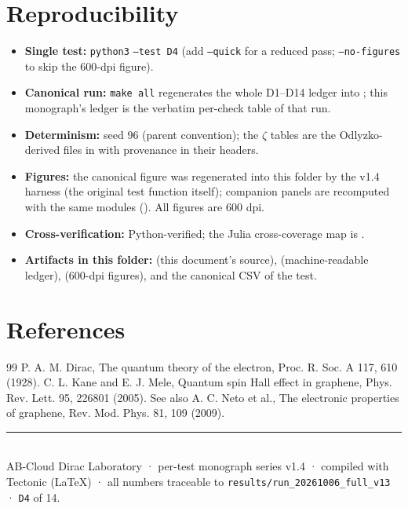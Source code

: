 \documentclass[11pt,a4paper]{article}
\begin{document}
\section{Reproducibility}
\begin{itemize}[leftmargin=1.2em, itemsep=0.15em]
\item \textbf{Single test:} \texttt{python3}  \texttt{--test D4} (add \texttt{--quick} for a reduced pass; \texttt{--no-figures} to skip the 600-dpi figure).
\item \textbf{Canonical run:} \texttt{make all} regenerates the whole D1--D14 ledger into ; this monograph's ledger is the verbatim per-check table of that run.
\item \textbf{Determinism:} seed 96 (parent convention); the $\zeta$ tables are the Odlyzko-derived files in  with provenance in their headers.
\item \textbf{Figures:} the canonical figure was regenerated into this folder by the v1.4 harness (the original test function itself); companion panels are recomputed with the same modules (). All figures are 600 dpi.
\item \textbf{Cross-verification:} Python-verified; the Julia cross-coverage map is .
\item \textbf{Artifacts in this folder:}  (this document's source),  (machine-readable ledger),  (600-dpi figures), and the canonical CSV of the test.
\end{itemize}

\section*{References}
\begin{thebibliography}{99}\small
{} P. A. M. Dirac, The quantum theory of the electron, Proc. R. Soc. A 117, 610 (1928).
 C. L. Kane and E. J. Mele, Quantum spin Hall effect in graphene, Phys. Rev. Lett. 95, 226801 (2005). See also A. C. Neto et al., The electronic properties of graphene, Rev. Mod. Phys. 81, 109 (2009).
\end{thebibliography}

\vfill
\noindent\rule{\textwidth}{0.4pt}\\[0.2em]
{\footnotesize\color{labgray} AB-Cloud Dirac Laboratory · per-test monograph series v1.4 · compiled with Tectonic (LaTeX) · all numbers traceable to \texttt{results/run\_20261006\_full\_v13} · \texttt{D4} of 14.}
\end{document}
